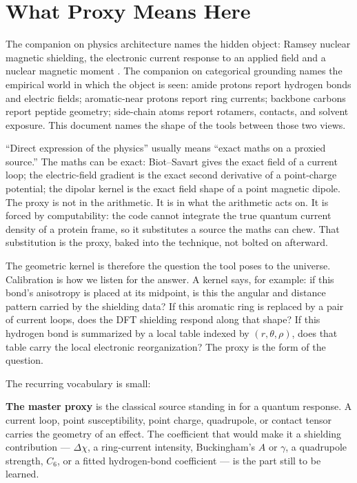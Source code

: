 \documentclass[11pt]{article}
\begin{document}
\tableofcontents
\clearpage

\section{What Proxy Means Here}

The companion on physics architecture names the hidden object: Ramsey nuclear
magnetic shielding, the electronic current response to an applied field and a
nuclear magnetic moment \cite{ramsey1950,facelli2011}. The companion on
categorical grounding names the empirical world in which the object is seen:
amide protons report hydrogen bonds and electric fields; aromatic-near protons
report ring currents; backbone carbons report peptide geometry; side-chain atoms
report rotamers, contacts, and solvent exposure. This document names the shape
of the tools between those two views.

``Direct expression of the physics'' usually means ``exact maths on a proxied
source.'' The maths can be exact: Biot--Savart gives the exact field of a
current loop; the electric-field gradient is the exact second derivative of a
point-charge potential; the dipolar kernel is the exact field shape of a point
magnetic dipole. The proxy is not in the arithmetic. It is in what the
arithmetic acts on. It is forced by computability: the code cannot integrate the
true quantum current density of a protein frame, so it substitutes a source the
maths can chew. That substitution is the proxy, baked into the technique, not
bolted on afterward.

The geometric kernel is therefore the question the tool poses to the universe.
Calibration is how we listen for the answer. A kernel says, for example:
if this bond's anisotropy is placed at its midpoint, is this the angular and
distance pattern carried by the shielding data? If this aromatic ring is
replaced by a pair of current loops, does the DFT shielding respond along that
shape? If this hydrogen bond is summarized by a local table indexed by
\((r,\theta,\rho)\), does that table carry the local electronic reorganization?
The proxy is the form of the question.

The recurring vocabulary is small:

\textbf{The master proxy} is the classical source standing in for a quantum
response. A current loop, point susceptibility, point charge, quadrupole, or
contact tensor carries the geometry of an effect. The coefficient that would
make it a shielding contribution --- \(\Delta\chi\), a ring-current intensity,
Buckingham's \(A\) or \(\gamma\), a quadrupole strength, \(C_6\), or a fitted
hydrogen-bond coefficient --- is the part still to be learned.
\end{document}
